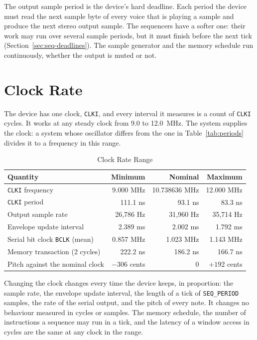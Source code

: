 The output sample period is the device's hard deadline. Each period the device must read the next sample byte of every
voice that is playing a sample and produce the next stereo output sample. The sequencers have a softer one: their work
may run over several sample periods, but it must finish before the next tick (Section~\ref{sec:seq-deadlines}). The
sample generator and the memory schedule run continuously, whether the output is muted or not.

\section{Clock Rate}
\label{sec:clock-rate}

The device has one clock, \texttt{CLKI}, and every interval it measures is a count of \texttt{CLKI} cycles. It works at
any steady clock from 9.0 to 12.0~MHz. The system supplies the clock: a system whose oscillator differs from the one in
Table~\ref{tab:periods} divides it to a frequency in this range.

\begin{table}[H]
	\centering
	\begin{tabular}{lrrr}
		\toprule
		\textbf{Quantity}                     & \textbf{Minimum} & \textbf{Nominal} & \textbf{Maximum} \\
		\midrule
		\texttt{CLKI} frequency               & 9.000 MHz        & 10.738636 MHz    & 12.000 MHz       \\
		\texttt{CLKI} period                  & 111.1 ns         & 93.1 ns          & 83.3 ns          \\
		Output sample rate                    & 26,786 Hz        & 31,960 Hz        & 35,714 Hz        \\
		Envelope update interval              & 2.389 ms         & 2.002 ms         & 1.792 ms         \\
		Serial bit clock \texttt{BCLK} (mean) & 0.857 MHz        & 1.023 MHz        & 1.143 MHz        \\
		Memory transaction (2 cycles)         & 222.2 ns         & 186.2 ns         & 166.7 ns         \\
		Pitch against the nominal clock       & $-306$ cents     & 0                & $+192$ cents     \\
		\bottomrule
	\end{tabular}
	\caption{Clock Rate Range}
	\label{tab:clock-range}
\end{table}

Changing the clock changes every time the device keeps, in proportion: the sample rate, the envelope update interval,
the length of a tick of \texttt{SEQ\_PERIOD} samples, the rate of the serial output, and the pitch of every note. It
changes no behaviour measured in cycles or samples. The memory schedule, the number of instructions a sequence may run
in a tick, and the latency of a window access in cycles are the same at any clock in the range.

